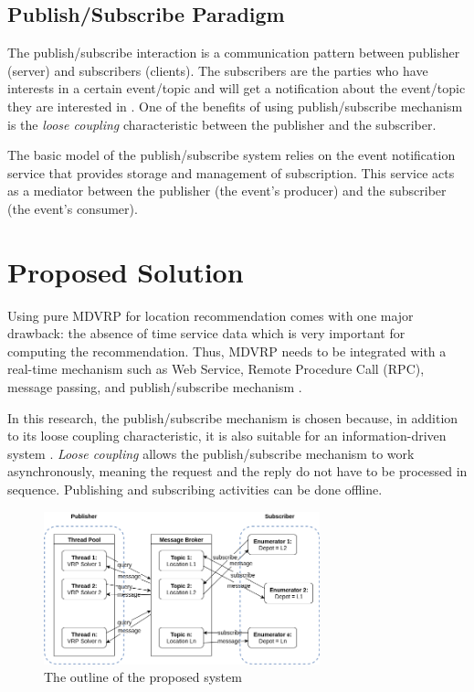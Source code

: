 \documentclass[conference]{IEEEtran}
\begin{document}
\subsection{Publish/Subscribe Paradigm}
\label{ssec:pub-sub}
The publish/subscribe interaction is a communication pattern between publisher (server) and subscribers (clients). The subscribers are the parties who have interests in a certain event/topic and will get a notification about the event/topic they are interested in \cite{eugster_many_2003}. One of the benefits of using publish/subscribe mechanism is the \textit{loose coupling} characteristic \cite{eugster_many_2003} between the publisher and the subscriber.

The basic model of the publish/subscribe system relies on the event notification service that provides storage and management of subscription. This service acts as a mediator between the publisher (the event's producer) and the subscriber (the event's consumer).


\section{Proposed Solution}
\label{sec:proposed-solution}
Using pure MDVRP for location recommendation comes with one major drawback: the absence of time service data which is very important for computing the recommendation. Thus, MDVRP needs to be integrated with a real-time mechanism such as Web Service, Remote Procedure Call (RPC), message passing, and publish/subscribe mechanism \cite{eugster_many_2003}.

In this research, the publish/subscribe mechanism is chosen because, in addition to its loose coupling characteristic, it is also suitable for an information-driven system \cite{muhl_large-scale_2002}. \textit{Loose coupling} allows the publish/subscribe mechanism to work asynchronously, meaning the request and the reply do not have to be processed in sequence. Publishing and subscribing activities can be done offline. 


\begin{figure}[!]
	\centering
	\includegraphics[width=8cm]{Resources/Images/system-overview}
	\caption{The outline of the proposed system}
	\label{fig:system-overview}
\end{figure}
\end{document}
